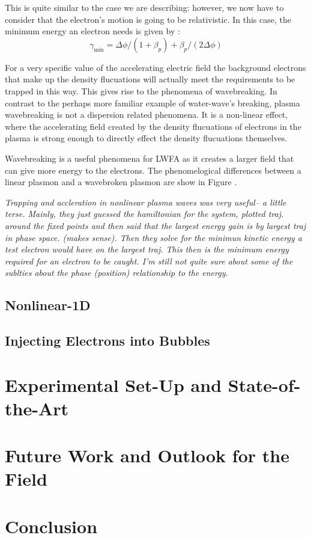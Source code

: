 \documentclass[12pt,letterpaper, titlepage]{article}
\begin{document}
This is quite similar to the case we are describing: however, we now have to
consider that the electron's motion is going to be relativistic. In this case,
the minimum energy an electron needs is given by :
\begin{equation}
    \gamma_\mathrm{min} = \Delta \phi / (1+\beta_p) + \beta_p/(2 \Delta \phi)
\end{equation}


For a very specific value of the accelerating electric field the background
electrons that make up the density flucuations will actually meet the
requirements to be trapped in this way. This gives rise to the phenomena of
wavebreaking. In contrast to the perhaps more familiar example of water-wave's
breaking, plasma wavebreaking is not a dispersion related phenomena. It is a
non-linear effect, where the accelerating field created by the density
flucuations of electrons in the plasma is strong enough to directly effect the
density flucuations themselves.

Wavebreaking is a useful phenomena for LWFA as it creates a larger field that
can give more energy to the electrons. The phenomelogical differences between a
linear plasmon and a wavebroken plasmon are show in Figure .

{\em Trapping and accleration in nonlinear plasma waves was very useful-- a
    little terse. Mainly, they just guessed the hamiltonian for the system,
    plotted traj. around the fixed points and then said that the largest energy
    gain is by largest traj in phase space. (makes sense). Then they solve for
    the minimun kinetic energy a test electron would have on the largest traj.
    This then is the minimum energy required for an electron to be caught. I'm
    still not quite sure about some of the sublties about the phase (position)
relationship to the energy.}
\subsection{Nonlinear-1D}

\subsection{Injecting Electrons into Bubbles}

\section{Experimental Set-Up and State-of-the-Art}

\section{Future Work and Outlook for the Field}

\section{Conclusion}
\end{document}
